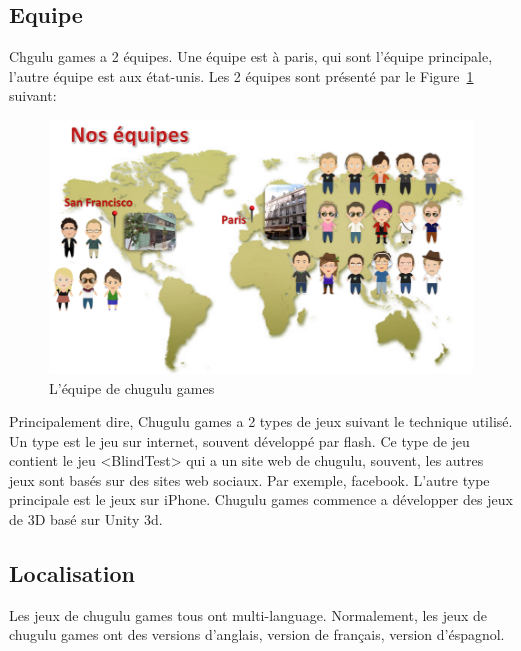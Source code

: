 
\subsection{Equipe} %
\label{sub:subsection_name}

Chgulu games a 2 équipes. Une équipe est à paris, qui sont l'équipe principale, l'autre équipe est aux état-unis. Les 2 équipes sont présenté par le Figure~\ref{fig:Image_EquipeChugulu} suivant:

\begin{figure}[htbp]
	\centering
		\includegraphics[width=6in]{Image/EquipeChugulu.png}
	\caption{L'équipe de chugulu games}
	\label{fig:Image_EquipeChugulu}
\end{figure}

Principalement dire, Chugulu games a 2 types de jeux suivant le technique utilisé. Un type est le jeu sur internet, souvent développé par flash. Ce type de jeu contient le jeu <BlindTest> qui a un site web de chugulu, souvent, les autres jeux sont basés sur des sites web sociaux. Par exemple, facebook. L'autre type principale est le jeux sur iPhone. Chugulu games commence a développer des jeux de 3D basé sur Unity 3d. 



\subsection{Localisation} %

Les jeux de chugulu games tous ont multi-language. Normalement, les jeux de chugulu games ont des versions d'anglais, version de français, version d'éspagnol. 

